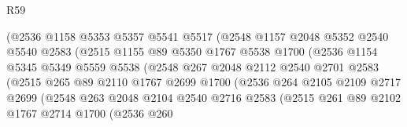 \begin{lexlean}{R59}
\begin{coremodule}
                          (@2536
                            @1158
                            @5353
                            @5357
                            @5541
                            @5517
                            (@2548
                              @1157
                              @2048
                              @5352
                              @2540
                              @5540
                              @2583
                              (@2515
                                @1155
                                @89
                                @5350
                                @1767
                                @5538
                                @1700
                                (@2536
                                  @1154
                                  @5345
                                  @5349
                                  @5559
                                  @5538
                                  (@2548
                                    @267
                                    @2048
                                    @2112
                                    @2540
                                    @2701
                                    @2583
                                    (@2515
                                      @265
                                      @89
                                      @2110
                                      @1767
                                      @2699
                                      @1700
                                      (@2536
                                        @264
                                        @2105
                                        @2109
                                        @2717
                                        @2699
                                        (@2548
                                          @263
                                          @2048
                                          @2104
                                          @2540
                                          @2716
                                          @2583
                                          (@2515
                                            @261
                                            @89
                                            @2102
                                            @1767
                                            @2714
                                            @1700
                                            (@2536
                                              @260

\end{coremodule}
\end{lexlean}
